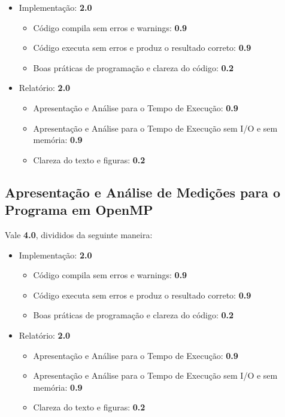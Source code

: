 \documentclass[final,12pt,a4paper]{elsarticle}
\begin{document}
\begin{itemize}
    \item Implementação: \textbf{2.0}
    \begin{itemize}
        \item Código compila sem erros e warnings: \textbf{0.9}
        \item Código executa sem erros e produz o resultado correto: \textbf{0.9}
        \item Boas práticas de programação e clareza do código: \textbf{0.2}
    \end{itemize}
    \item Relatório: \textbf{2.0}
    \begin{itemize}
        \item Apresentação e Análise para o Tempo de Execução: \textbf{0.9}
        \item Apresentação e Análise para o Tempo de Execução sem I/O e sem memória: \textbf{0.9}
        \item Clareza do texto e figuras: \textbf{0.2}
    \end{itemize}
\end{itemize}

\subsection{Apresentação e Análise de Medições para o Programa em OpenMP}

Vale \textbf{4.0}, divididos da seguinte maneira:

\begin{itemize}
    \item Implementação: \textbf{2.0}
    \begin{itemize}
        \item Código compila sem erros e warnings: \textbf{0.9}
        \item Código executa sem erros e produz o resultado correto: \textbf{0.9}
        \item Boas práticas de programação e clareza do código: \textbf{0.2}
    \end{itemize}
    \item Relatório: \textbf{2.0}
    \begin{itemize}
        \item Apresentação e Análise para o Tempo de Execução: \textbf{0.9}
        \item Apresentação e Análise para o Tempo de Execução sem I/O e sem memória: \textbf{0.9}
        \item Clareza do texto e figuras: \textbf{0.2}
    \end{itemize}
\end{itemize}
\end{document}
